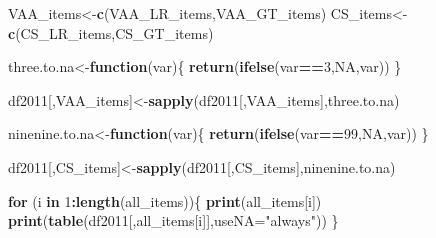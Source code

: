 \documentclass[
]{article}
\newenvironment{Shaded}{\begin{snugshade}}{\end{snugshade}}
\newcommand{\ControlFlowTok}[1]{\textcolor[rgb]{0.13,0.29,0.53}{\textbf{#1}}}
\newcommand{\DataTypeTok}[1]{\textcolor[rgb]{0.13,0.29,0.53}{#1}}
\newcommand{\DecValTok}[1]{\textcolor[rgb]{0.00,0.00,0.81}{#1}}
\newcommand{\KeywordTok}[1]{\textcolor[rgb]{0.13,0.29,0.53}{\textbf{#1}}}
\newcommand{\NormalTok}[1]{#1}
\newcommand{\OperatorTok}[1]{\textcolor[rgb]{0.81,0.36,0.00}{\textbf{#1}}}
\newcommand{\OtherTok}[1]{\textcolor[rgb]{0.56,0.35,0.01}{#1}}
\newcommand{\StringTok}[1]{\textcolor[rgb]{0.31,0.60,0.02}{#1}}
\begin{document}
\begin{Shaded}
\begin{Highlighting}[]
\NormalTok{VAA_items<-}\KeywordTok{c}\NormalTok{(VAA_LR_items,VAA_GT_items)}
\NormalTok{CS_items<-}\KeywordTok{c}\NormalTok{(CS_LR_items,CS_GT_items)}

\NormalTok{three.to.na<-}\ControlFlowTok{function}\NormalTok{(var)\{}
  \KeywordTok{return}\NormalTok{(}\KeywordTok{ifelse}\NormalTok{(var}\OperatorTok{==}\DecValTok{3}\NormalTok{,}\OtherTok{NA}\NormalTok{,var))}
\NormalTok{\}}

\NormalTok{df2011[,VAA_items]<-}\KeywordTok{sapply}\NormalTok{(df2011[,VAA_items],three.to.na)}

\NormalTok{ninenine.to.na<-}\ControlFlowTok{function}\NormalTok{(var)\{}
  \KeywordTok{return}\NormalTok{(}\KeywordTok{ifelse}\NormalTok{(var}\OperatorTok{==}\DecValTok{99}\NormalTok{,}\OtherTok{NA}\NormalTok{,var))}
\NormalTok{\}}

\NormalTok{df2011[,CS_items]<-}\KeywordTok{sapply}\NormalTok{(df2011[,CS_items],ninenine.to.na)}



\ControlFlowTok{for}\NormalTok{ (i }\ControlFlowTok{in} \DecValTok{1}\OperatorTok{:}\KeywordTok{length}\NormalTok{(all_items))\{}
  \KeywordTok{print}\NormalTok{(all_items[i])}
  \KeywordTok{print}\NormalTok{(}\KeywordTok{table}\NormalTok{(df2011[,all_items[i]],}\DataTypeTok{useNA=}\StringTok{"always"}\NormalTok{))}
\NormalTok{  \}}
\end{Highlighting}
\end{Shaded}
\end{document}
